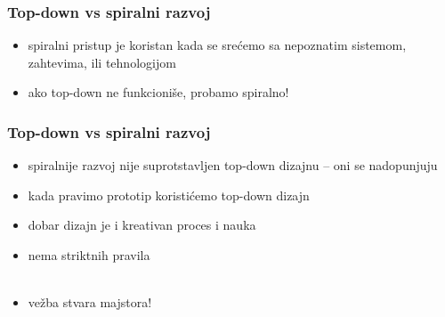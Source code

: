 \documentclass[utf8,compress]{beamer}
\begin{document}
\begin{frame}
  \frametitle{Top-down vs spiralni razvoj}
\begin{itemize}
  \item spiralni pristup je koristan kada se srećemo sa nepoznatim sistemom, zahtevima, ili tehnologijom
  \item ako top-down ne funkcioniše, probamo spiralno!
\end{itemize}
\end{frame}

\begin{frame}
  \frametitle{Top-down vs spiralni razvoj}
\begin{itemize}
  \item spiralnije razvoj nije suprotstavljen top-down dizajnu -- oni se nadopunjuju
  \item kada pravimo prototip koristićemo top-down dizajn
  \item dobar dizajn je i kreativan proces i nauka
  \item nema striktnih pravila \\ \ \\
  \item vežba stvara majstora!
\end{itemize}
\end{frame}
\end{document}
